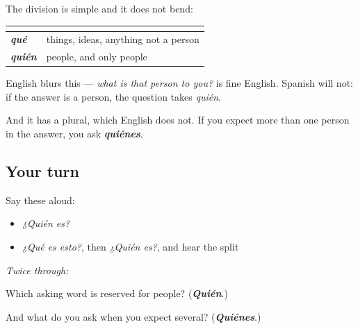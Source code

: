 \begin{culture}
The division is simple and it does not bend:

\noindent
\begin{tabularx}{\linewidth}{@{}>{\raggedright\arraybackslash}X>{\raggedright\arraybackslash}X@{}}
\toprule
\textbf{} & \textbf{} \\
\midrule
\emph{\textbf{qué}} & things, ideas, anything not a person \\
\emph{\textbf{quién}} & people, and only people \\
\bottomrule
\end{tabularx}

English blurs this — \emph{what is that person to you?} is fine English. Spanish will not: if the answer is a person, the question takes \emph{quién}.

And it has a plural, which English does not. If you expect more than one person in the answer, you ask \emph{\textbf{quiénes}}.
\end{culture}

\subsection*{Your turn}
Say these aloud:

\begin{itemize}
\raggedright
  \item \emph{¿Quién es?}
  \item \emph{¿Qué es esto?}, then \emph{¿Quién es?}, and hear the split
\end{itemize}

\emph{Twice through:}

\begin{tcolorbox}[breakable,colback=teal!4,colframe=teal!35!black,title={Before you move on}]
Which asking word is reserved for people? (\emph{\textbf{Quién}}.)

And what do you ask when you expect several? (\emph{\textbf{Quiénes}}.)
\end{tcolorbox}
